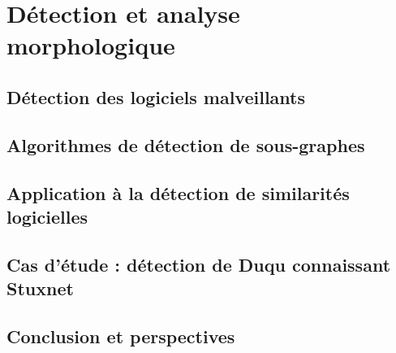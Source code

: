 % 

\part{Détection et analyse morphologique}

\DontFrameThisInToc
\chapter{Détection des logiciels malveillants\label{chap:detection}}


\DontFrameThisInToc
\chapter{Algorithmes de détection de sous-graphes\label{chap:algos}}


\DontFrameThisInToc
\chapter{Application à la détection de similarités logicielles\label{chap:libs}}


\DontFrameThisInToc
\chapter{Cas d'étude : détection de Duqu connaissant Stuxnet\label{chap:duqu-stux}}


\DontFrameThisInToc
\chapter*{Conclusion et perspectives\label{chap:conclusion}}


\PutLineInToc

\PrintIndex

\onecolumn


